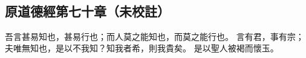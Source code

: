 ﻿%
%

\chapter{~}

\section{原道德經第七十章（未校註）}

\begin{withgezhu}

\zhsong


吾言甚易知也，甚易行也；而人莫之能知也，而莫之能行也。
言有君，事有宗；夫唯無知也，是以不我知？知我者希，則我貴矣。
是以聖人被褐而懷玉。

\end{withgezhu}
